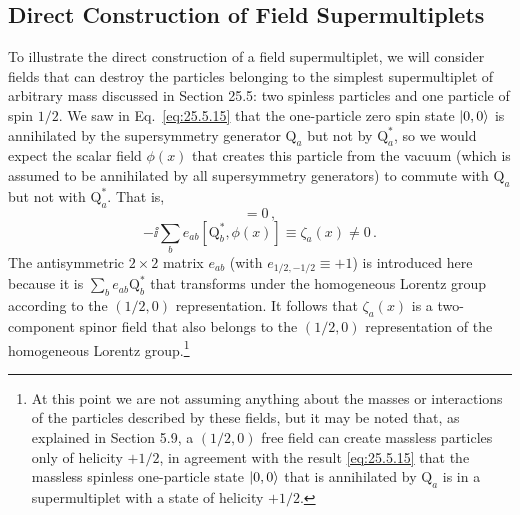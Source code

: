 
\subsection{Direct Construction of Field Supermultiplets}

\providecommand{\WeylQ}{\mathrm{Q}}
\providecommand{\MajoranaQ}{Q}

To illustrate the direct construction of a field supermultiplet, we will
consider fields that can destroy the particles belonging to the simplest
supermultiplet of arbitrary mass discussed in Section 25.5: two spinless
particles and one particle of spin \(1/2\). We saw in
Eq.~\eqref{eq:25.5.15} that the one-particle zero spin state \(\lvert 0,0\rangle\) is
annihilated by the supersymmetry generator \(\WeylQ_a\) but not by
\(\WeylQ_a^*\), so we would expect the scalar field \(\phi(x)\) that creates
this particle from the vacuum (which is assumed to be annihilated by all
supersymmetry generators) to commute with \(\WeylQ_a\) but not with
\(\WeylQ_a^*\). That is,
\begin{equation}
  [\WeylQ_a,\phi(x)]=0\,,
  \tag{26.1.1}\label{eq:26.1.1}
\end{equation}
\begin{equation}
  -\ii\sum_b e_{ab}[\WeylQ_b^*,\phi(x)]
  \equiv\zeta_a(x)\ne0\,.
  \tag{26.1.2}\label{eq:26.1.2}
\end{equation}
The antisymmetric \(2\times2\) matrix \(e_{ab}\) (with
\(e_{1/2,-1/2}\equiv+1\)) is introduced here because it is
\(\sum_b e_{ab}\WeylQ_b^*\) that transforms under the homogeneous Lorentz
group according to the \((1/2,0)\) representation. It follows that
\(\zeta_a(x)\) is a two-component spinor field that also belongs to the
\((1/2,0)\) representation of the homogeneous Lorentz group.\footnote{At
this point we are not assuming anything about the masses or interactions of
the particles described by these fields, but it may be noted that, as
explained in Section 5.9, a \((1/2,0)\) free field can create massless
particles only of helicity \(+1/2\), in agreement with the result
\eqref{eq:25.5.15} that the massless spinless one-particle state
\(\lvert 0,0\rangle\) that is annihilated by \(\WeylQ_a\) is in a supermultiplet
with a state of helicity \(+1/2\).}

